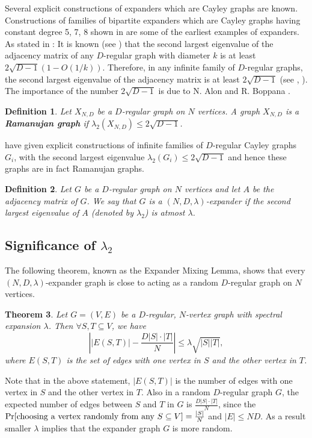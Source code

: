 \documentclass{article}
\newtheorem{theorem}{Theorem}[section]
\newtheorem{definition}[theorem]{Definition}
\begin{document}
Several explicit constructions of expanders which are Cayley graphs are known. Constructions of families of bipartite expanders which are Cayley graphs having constant degree 5, 7, 8 shown in \cite{GG1981, JM1987} are some of the earliest examples of expanders. As stated in \cite[pp.153]{AS2016}: It is known (see \cite{Nil1991}) that the second largest eigenvalue of the adjacency matrix of any $D$-regular graph with diameter $k$ is at least $2\sqrt{D-1}(1-O(1/k))$. Therefore, in any infinite family of $D$-regular graphs, the second largest eigenvalue of the adjacency matrix is at least $2\sqrt{D-1}$ (see \cite[Chapter 3]{KS2011}, \cite[Proposition 4.2]{LPS1988}). The importance of the number $2\sqrt{D-1}$ is due to N. Alon and R. Boppana \cite[pp. 95]{Alo1986}.
\begin{definition}{\rm \cite[Definition 1.1]{LPS1988}}
Let $X_{N,D}$ be a $D$-regular graph on $N$ vertices. A graph $X_{N,D}$ is a {\bf Ramanujan graph} if $\lambda_2(X_{N,D})\leq 2\sqrt{D-1}$.
\end{definition}
\cite[pp.262]{LPS1988} have given explicit constructions of infinite families of $D$-regular Cayley graphs $G_i$, with the second largest eigenvalue $\lambda_2(G_i)\leq 2\sqrt{D-1}$ and hence these graphs are in fact Ramanujan graphs.%
\begin{definition}
Let $G$ be a $D$-regular graph on $N$ vertices and let $A$ be the adjacency matrix of $G$. We say that $G$ is a $(N,D,\lambda )$-expander if the second largest eigenvalue of $A$ {\rm (}denoted by $\lambda _2${\rm )} is atmost $\lambda$.
\end{definition}

\subsection{Significance of $\lambda_2$}
The following theorem, known as the Expander Mixing Lemma, shows that every $(N,D,\lambda )$-expander graph is close to acting as a random $D$-regular graph on $N$ vertices.
\begin{theorem}{\rm \cite{AC1988}}
Let $G=(V,E)$ be a $D$-regular, $N$-vertex graph with spectral expansion $\lambda$. Then $\forall S,T\subseteq V$, we have
\[
\left ||E(S,T)|-\frac{D|S|\cdot |T|}{N}\right |\leq \lambda \sqrt{|S||T|},
\]
where $E(S,T)$ is the set of edges with one vertex in $S$ and the other vertex in $T$.
\end{theorem}
Note that in the above statement, $|E(S,T)|$ is the number of edges with one vertex in $S$ and the other vertex in $T$. Also in a random $D$-regular graph $G$, the expected number of edges between $S$ and $T$ in $G$ is $\frac{D|S|\cdot |T|}{N}$, since the $\Pr [{\rm choosing~a~vertex~randomly~from~any}~S\subseteq V]=\frac{|S|}{N}$ and $|E|\leq ND$. As a result smaller $\lambda$ implies that the expander graph $G$ is more random.
\end{document}
